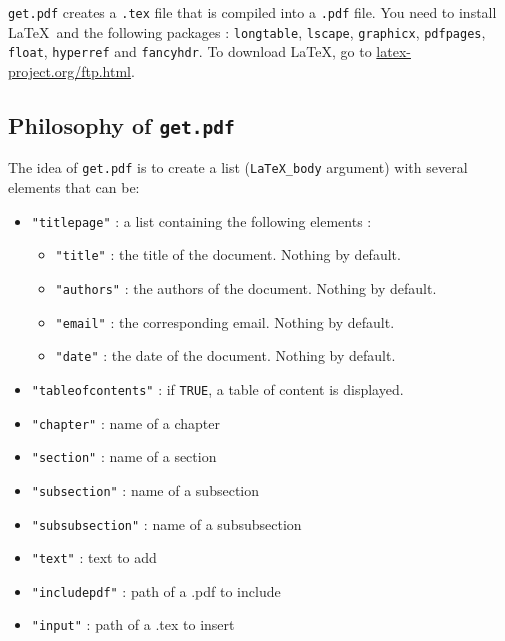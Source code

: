 \documentclass{article}\usepackage[]{graphicx}\usepackage[]{color}
\begin{document}
\texttt{get.pdf} creates a \texttt{.tex} file that is compiled into a \texttt{.pdf} file.
You need to install \LaTeX~and the following packages : \texttt{longtable}, \texttt{lscape}, \texttt{graphicx}, \texttt{pdfpages}, \texttt{float}, \texttt{hyperref} and \texttt{fancyhdr}. 
To download LaTeX, go to \url{latex-project.org/ftp.html}.


\subsection{Philosophy of \texttt{get.pdf} }

The idea of \texttt{get.pdf} is to create a list (\texttt{LaTeX\_body} argument) with several elements that can be:

\begin{itemize}
\item \texttt{"titlepage"} : a list containing the following elements :
	\begin{itemize}
	\item \texttt{"title"} : the title of the document. Nothing by default.
	\item \texttt{"authors"} : the authors of the document. Nothing by default.
	\item \texttt{"email"} : the corresponding email. Nothing by default.
	\item \texttt{"date"} : the date of the document. Nothing by default.
	\end{itemize}

\item \texttt{"tableofcontents"} : if \texttt{TRUE}, a table of content is displayed.

\item \texttt{"chapter"} : name of a chapter

\item \texttt{"section"} : name of a section

\item \texttt{"subsection"} : name of a subsection

\item \texttt{"subsubsection"} : name of a subsubsection

\item \texttt{"text"} : text to add

\item \texttt{"includepdf"} : path of a .pdf to include

\item \texttt{"input"} : path of a .tex to insert


\end{itemize}
\end{document}
